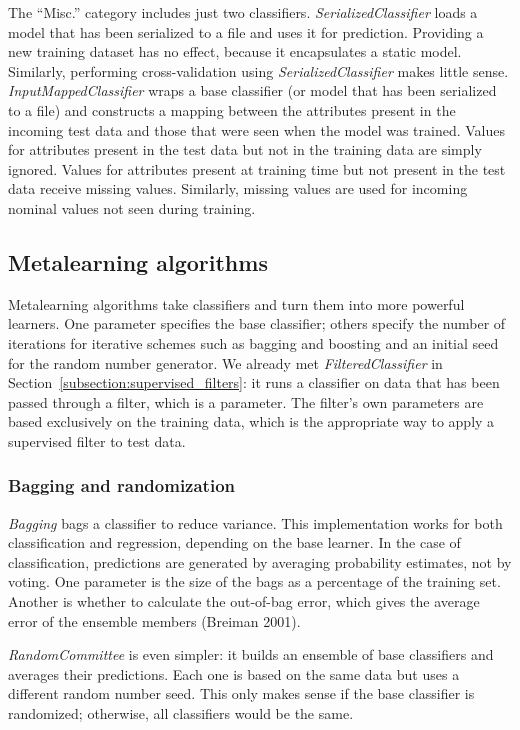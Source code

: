 The ``Misc.'' category includes just two
classifiers. \textit{SerializedClassifier} loads a model that has been
serialized to a file and uses it for prediction. Providing a new
training dataset has no effect, because it encapsulates a static
model. Similarly, performing cross-validation using
\textit{SerializedClassifier} makes little
sense. \textit{InputMappedClassifier} wraps a base classifier (or
model that has been serialized to a file) and constructs a mapping
between the attributes present in the incoming test data and those
that were seen when the model was trained. Values for attributes
present in the test data but not in the training data are simply
ignored. Values for attributes present at training time but not
present in the test data receive missing values. Similarly, missing
values are used for incoming nominal values not seen during training.

\subsection{Metalearning algorithms}

Metalearning algorithms take classifiers and turn them into more
powerful learners. One parameter specifies the base classifier; others
specify the number of iterations for iterative schemes such as bagging
and boosting and an initial seed for the random number generator. We
already met \textit{FilteredClassifier} in
Section~\ref{subsection:supervised_filters}: it runs a classifier on
data that has been passed through a filter, which is a parameter. The
filter’s own parameters are based exclusively on the training data,
which is the appropriate way to apply a supervised filter to test
data.

\subsubsection{Bagging and randomization}

\textit{Bagging} bags a classifier to reduce variance. This
implementation works for both classification and regression, depending
on the base learner. In the case of classification, predictions are
generated by averaging probability estimates, not by voting. One
parameter is the size of the bags as a percentage of the training
set. Another is whether to calculate the out-of-bag error, which gives
the average error of the ensemble members (Breiman 2001).

\textit{RandomCommittee} is even simpler: it builds an ensemble of
base classifiers and averages their predictions. Each one is based on
the same data but uses a different random number seed. This only makes
sense if the base classifier is randomized; otherwise, all classifiers
would be the same.

